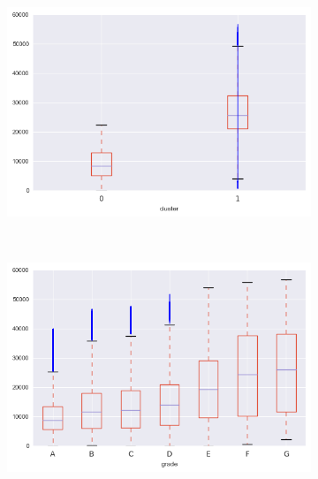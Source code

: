 \begin{apendicesenv}
\begin{figure}[t!]
\begin{subfigure}[t]{0.5\textwidth}
			\centerline{\includegraphics[width=1\textwidth]{img/total_pymnt_by_cluster}}
    	\end{subfigure}%
    	~ 
    	\begin{subfigure}[t]{0.5\textwidth}
    		\centering
   
			\centerline{\includegraphics[width=1\textwidth]{img/total_pymnt_by_grade}}

    	\end{subfigure}
    	\\
    	        \caption{out\textunderscore prncp\textunderscore inv}
    	\begin{subfigure}[t]{0.5\textwidth}
    		\centering


\end{subfigure}
\end{figure}
\end{apendicesenv}
